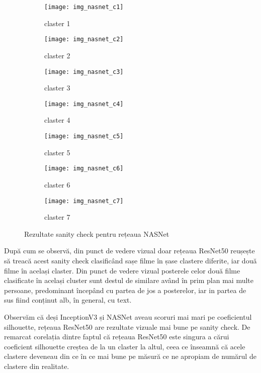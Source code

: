\begin{figure}[!tbp]
  \centering
  \begin{subfigure}[b]{0.48\textwidth}
    \texttt{[image: img\_nasnet\_c1]}
    \caption{claster 1}
  \end{subfigure}
  \hfill
  \begin{subfigure}[b]{0.48\textwidth}
    \texttt{[image: img\_nasnet\_c2]}
    \caption{claster 2}
  \end{subfigure}
   \hfill
  \begin{subfigure}[b]{0.48\textwidth}
    \texttt{[image: img\_nasnet\_c3]}
    \caption{claster 3}
  \end{subfigure}
  \hfill
  \begin{subfigure}[b]{0.48\textwidth}
    \texttt{[image: img\_nasnet\_c4]}
    \caption{claster 4}
  \end{subfigure}
  \hfill
  \begin{subfigure}[b]{0.48\textwidth}
    \texttt{[image: img\_nasnet\_c5]}
    \caption{claster 5}
  \end{subfigure}
  \hfill
  \begin{subfigure}[b]{0.48\textwidth}
    \texttt{[image: img\_nasnet\_c6]}
    \caption{claster 6}
  \end{subfigure}
    \hfill
  \begin{subfigure}[b]{0.48\textwidth}
    \texttt{[image: img\_nasnet\_c7]}
    \caption{claster 7}
  \end{subfigure}
  \caption[Rezultate sanity check pentru rețeaua NASNet]{Rezultate sanity check pentru rețeaua NASNet}
\end{figure}

După cum se observă, din punct de vedere vizual doar rețeaua ResNet50 reușește să treacă acest sanity check clasificând sașe filme în șase clastere diferite, iar două filme în același claster. Din punct de vedere vizual posterele celor două filme clasificate în același cluster sunt destul de similare având în prim plan mai multe persoane, predominant începând cu partea de jos a posterelor, iar in partea de sus fiind conținut alb, în general, cu text.

Observăm că deși InceptionV3 și NASNet aveau scoruri mai mari pe coeficientul silhouette, rețeaua ResNet50 are rezultate vizuale mai bune pe sanity check. De remarcat corelația dintre faptul că rețeaua ResNet50 este singura a cărui coeficient silhouette creștea de la un claster la altul, ceea ce înseamnă că acele clastere deveneau din ce în ce mai bune pe măsură ce ne apropiam de numărul de clastere din realitate.

